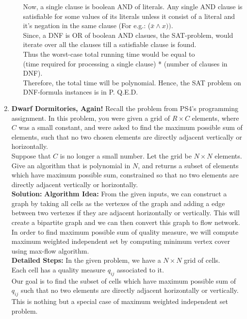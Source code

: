 \documentclass[12pt]{article}
\begin{document}
\begin{enumerate}
\begin{enumerate}
Now, a single clause is boolean AND of literals. Any single AND clause is satisfiable for some values of its literals unless it consist of a literal and it's negation in the same clause (For e.g.: ($\bar{x} \land x))$.\\
Since, a DNF is OR of boolean AND clasues, the SAT-problem, would iterate over all the clauses till a satisfiable clause is found. \\
Thus the worst-case total running time would be equal to \\
(time required for processing a single clause) * (number of clauses in DNF).\\
Therefore, the total time will be polynomial.
Hence, the SAT problem on DNF-formula instances is in P. \hfill Q.E.D.
\end{enumerate}
\pagebreak
\item \textbf{Dwarf Dormitories, Again!} Recall the problem from PS4's programming assignment. In this problem, you were given a grid of $R \times C$ elements, where $C$ was a small constant, and were asked to find the maximum possible sum of elements, such that no two chosen elements are directly adjacent vertically or horizontally.\\
Suppose that $C$ is no longer a small number. Let the grid be $N \times N$ elements. Give an algorithm that is polynomial in $N$, and returns a subset of elements which have maximum possible sum, constrained so that no two elements are directly adjacent vertically or horizontally.\\
\textbf{Solution:} \textbf{Algorithm Idea:} From the given inputs, we can construct a graph by taking all cells as the vertexes of the graph and adding a edge between two vertexes if they are adjacent horizontally or vertically. This will create a bipartite graph and we can then convert this graph to flow network. In order to find maximum possible sum of quality measure, we will compute maximum weighted independent set by computing minimum vertex cover using max-flow algorithm.\\
\textbf{Detailed Steps:}
In the given problem, we have a $N \times N$ grid of cells.\\
Each cell has a quality measure $q_{ij}$ associated to it.\\
Our goal is to find the subset of cells which have maximum possible sum of $q_{ij}$ such that no two elements are directly adjacent horizontally or vertically.\\
This is nothing but a special case of maximum weighted independent set problem.

\end{enumerate}
\end{document}

